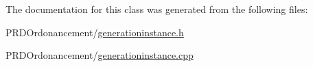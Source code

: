 The documentation for this class was generated from the following files\+:\begin{DoxyCompactItemize}
\item 
P\+R\+D\+Ordonancement/\hyperlink{generationinstance_8h}{generationinstance.\+h}\item 
P\+R\+D\+Ordonancement/\hyperlink{generationinstance_8cpp}{generationinstance.\+cpp}\end{DoxyCompactItemize}
